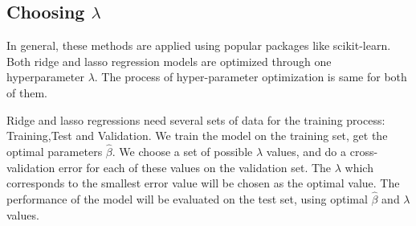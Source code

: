 \documentclass{article}
\begin{document}
\subsection*{Choosing $\lambda$}
In general, these methods are applied using popular packages like scikit-learn. Both ridge and lasso regression models are optimized through one hyperparameter $\lambda$. The process of hyper-parameter optimization is same for both of them.

Ridge and lasso regressions need several sets of data for the training process: Training,Test and Validation.
We train the model on the training set, get the optimal parameters $\hat{\beta}$. We choose a set of possible $\lambda$ values, and do a cross-validation error for each of these values on the validation set. The $\lambda$ which corresponds to the smallest error value will be chosen as the optimal value. The performance of the model will be evaluated on the test set, using optimal $\hat{\beta}$ and $\lambda$ values.
\end{document}
